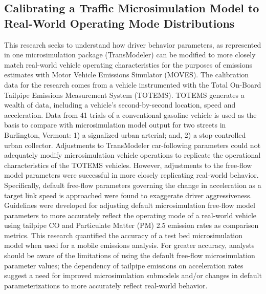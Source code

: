 \documentclass{article}
\begin{document}
\subsection*{Calibrating a Traffic Microsimulation Model to Real-World Operating Mode Distributions \cite{calibModeDis} }
This research seeks to understand how driver behavior parameters, as represented in one microsimulation package (TransModeler) can be modified to more closely match real-world vehicle operating characteristics for the purposes of emissions estimates with Motor Vehicle Emissions Simulator (MOVES). The calibration data for the research comes from a vehicle instrumented with the Total On-Board Tailpipe Emissions Measurement System (TOTEMS). TOTEMS generates a wealth of data, including a vehicle’s second-by-second location, speed and acceleration. Data from 41 trials of a conventional gasoline vehicle is used as the basis to compare with microsimulation model output for two streets in Burlington, Vermont: 1) a signalized urban arterial; and, 2) a stop-controlled urban collector. Adjustments to TransModeler car-following parameters could not adequately modify microsimulation vehicle operations to replicate the operational characteristics of the TOTEMS vehicles. However, adjustments to the free-flow model parameters were successful in more closely replicating real-world behavior. Specifically, default free-flow parameters governing the change in acceleration as a target link speed is approached were found to exaggerate driver aggressiveness. Guidelines were developed for adjusting default microsimulation free-flow model parameters to more accurately reflect the operating mode of a real-world vehicle using tailpipe CO and Particulate Matter (PM) 2.5 emission rates as comparison metrics. This research quantified the accuracy of a test bed microsimulation model when used for a mobile emissions analysis. For greater accuracy, analysts should be aware of the limitations of using the default free-flow microsimulation parameter values; the dependency of tailpipe emissions on acceleration rates suggest a need for improved microsimulation submodels and/or changes in default parameterizations to more accurately reflect real-world behavior.
\end{document}
